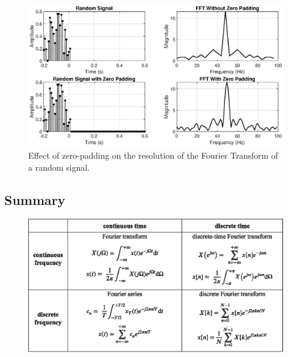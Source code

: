 \begin{figure}[H]
    \centering
    \includegraphics[width=\linewidth]{Digital Biosignal Processing/images/zero_padding.eps}
    \caption{Effect of zero-padding on the resolution of the Fourier Transform of a random signal.}
    \label{fig:zero-padding}
\end{figure}

\subsection{Summary}
\begin{figure}[H]
    \centering
    \includegraphics{images/summary_of_FTs.eps}
\end{figure}

